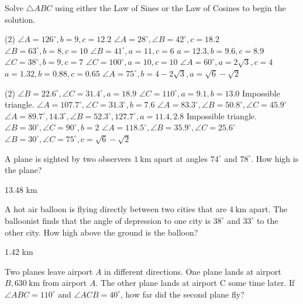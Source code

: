 \documentclass[12pt,fleqn]{book}
\newcommand{\prb}[1]{\begin{Exercise}\parbox[t]{\textwidth-5em}{#1}\end{Exercise}}
\newcommand{\sol}[1]{\begin{Answer}\parbox[t]{\textwidth-5em}{#1}\end{Answer}}
\begin{document}
\prb{
	Solve $\triangle A B C$ using either the Law of Sines or the Law of Cosines to begin the solution.
\begin{tasks}(2)
	\task $\angle A=126^{\circ}, b=9, c=12.2$
	\vspace{10em}
	\task $\angle A=28^{\circ}, \angle B=42^{\circ}, c=18.2$
	\vspace{10em}
	\task $\angle B=63^{\circ}, b=8, c=10$
	\vspace{10em}
	\task $\angle B=41^{\circ}, a=11, c=6$
	\vspace{10em}
	\task $a=12.3, b=9.6, c=8.9$
	\vspace{10em}
	\task $\angle C=38^{\circ}, b=9, c=7$
	\vspace{10em}
	\task $\angle C=100^{\circ}, a=10, c=10$
	\vspace{10em}
	\task $\angle A=60^{\circ}, a=2 \sqrt{3}, c=4$
	\vspace{10em}
	\task $a=1.32, b=0.88, c=0.65$
	\vspace{10em}
	\task $\angle A=75^{\circ}, b=4-2 \sqrt{3}, a=\sqrt{6}-\sqrt{2}$
	\vspace{10em}
\end{tasks}
}
\sol{
	\begin{tasks}(2)
		\task $\angle B=22.6^{\circ}, \angle C=31.4^{\circ}, a=18.9$
		\task $\angle C=110^{\circ}, a=9.1, b=13.0$
		\task Impossible triangle.
		\task $\angle A=107.7^{\circ}, \angle C=31.3^{\circ}, b=7.6$
		\task $\angle A=83.3^{\circ}, \angle B=50.8^{\circ}, \angle C=45.9^{\circ}$
		\task $\angle A=89.7^{\circ}, 14.3^{\circ}, \angle B=52.3^{\circ}, 127.7^{\circ}, a=11.4,2.8$
		\task Impossible triangle.
		\task $\angle B=30^{\circ}, \angle C=90^{\circ}, b=2$
		\task $\angle A=118.5^{\circ}, \angle B=35.9^{\circ}, \angle C=25.6^{\circ}$
		\task $\angle B=30^{\circ}, \angle C=75^{\circ}, c=\sqrt{6}-\sqrt{2}$
	\end{tasks}
}
\clearpage
\prb{A plane is sighted by two observers $1 \mathrm{~km}$ apart at angles $74^{\circ}$ and $78^{\circ}$. How high is the plane?}
\vfill
\sol{13.48 km}
\prb{A hot air balloon is flying directly between two cities that are $4 \mathrm{~km}$ apart. The balloonist finds that the angle of depression to one city is $38^{\circ}$ and $33^{\circ}$ to the other city. How high above the ground is the balloon?}
\vfill
\sol{1.42 km}
\prb{
Two planes leave airport $A$ in different directions. One plane lands at airport $B, 630 \mathrm{~km}$ from airport $A$. The other plane lands at airport $\mathrm{C}$ some time later. If $\angle A B C=110^{\circ}$ and $\angle A C B=40^{\circ}$, how far did the second plane fly?
}
\end{document}
